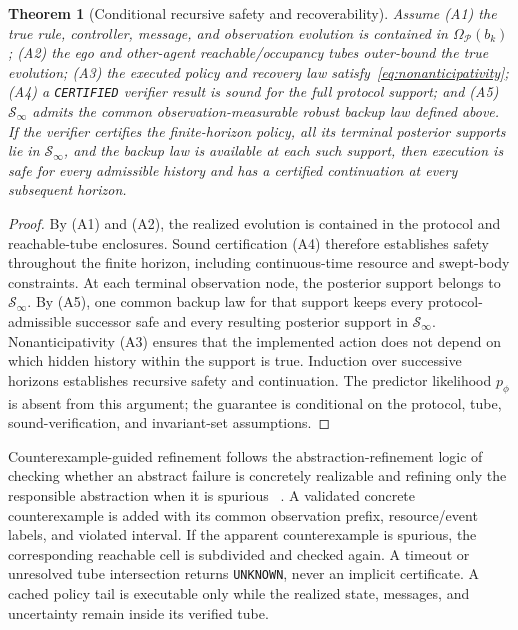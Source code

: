 \documentclass[letterpaper]{article} %
\newtheorem{theorem}{Theorem}
\begin{document}
\begin{theorem}[Conditional recursive safety and recoverability]
Assume (A1) the true rule, controller, message, and observation evolution
is contained in $\Omega_{\mathcal P}(b_k)$; (A2) the ego and other-agent
reachable/occupancy tubes outer-bound the true evolution; (A3) the executed
policy and recovery law satisfy~\eqref{eq:nonanticipativity}; (A4) a
\texttt{CERTIFIED} verifier result is sound for the full protocol support;
and (A5) $\mathcal S_\infty$ admits the common observation-measurable
robust backup law defined above. If the verifier certifies the finite-horizon
policy, all its terminal posterior supports lie in $\mathcal S_\infty$,
and the backup law is available at each such support, then execution is safe
for every admissible history and has a certified continuation at every
subsequent horizon.
\end{theorem}
\begin{proof}
By (A1) and (A2), the realized evolution is contained in the protocol and
reachable-tube enclosures. Sound certification (A4) therefore establishes
safety throughout the finite horizon, including continuous-time resource
and swept-body constraints. At each terminal observation node, the posterior
support belongs to $\mathcal S_\infty$. By (A5), one common backup law
for that support keeps every protocol-admissible successor safe and every
resulting posterior support in $\mathcal S_\infty$. Nonanticipativity
(A3) ensures that the implemented action does not depend on which hidden
history within the support is true. Induction over successive horizons
establishes recursive safety and continuation. The predictor likelihood
$p_\phi$ is absent from this argument; the guarantee is conditional on the
protocol, tube, sound-verification, and invariant-set assumptions.
\end{proof}

Counterexample-guided refinement follows the abstraction-refinement logic
of checking whether an abstract failure is concretely realizable and
refining only the responsible abstraction when it is spurious
~\citep{alur2003counter,seipp2013counterexample}. A validated concrete
counterexample is added with its common observation prefix, resource/event
labels, and violated interval. If the apparent counterexample is spurious,
the corresponding reachable cell is subdivided and checked again. A timeout
or unresolved tube intersection returns \texttt{UNKNOWN}, never an implicit
certificate. A cached policy tail is executable only while the realized
state, messages, and uncertainty remain inside its verified tube.
\end{document}
